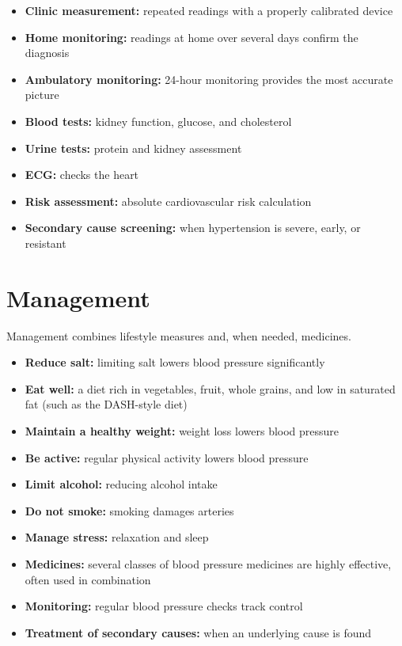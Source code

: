 \begin{itemize}
    \item \textbf{Clinic measurement:} repeated readings with a properly calibrated device
    \item \textbf{Home monitoring:} readings at home over several days confirm the diagnosis
    \item \textbf{Ambulatory monitoring:} 24-hour monitoring provides the most accurate picture
    \item \textbf{Blood tests:} kidney function, glucose, and cholesterol
    \item \textbf{Urine tests:} protein and kidney assessment
    \item \textbf{ECG:} checks the heart
    \item \textbf{Risk assessment:} absolute cardiovascular risk calculation
    \item \textbf{Secondary cause screening:} when hypertension is severe, early, or resistant
\end{itemize}

\section*{Management}
Management combines lifestyle measures and, when needed, medicines.

\begin{itemize}
    \item \textbf{Reduce salt:} limiting salt lowers blood pressure significantly
    \item \textbf{Eat well:} a diet rich in vegetables, fruit, whole grains, and low in saturated fat (such as the DASH-style diet)
    \item \textbf{Maintain a healthy weight:} weight loss lowers blood pressure
    \item \textbf{Be active:} regular physical activity lowers blood pressure
    \item \textbf{Limit alcohol:} reducing alcohol intake
    \item \textbf{Do not smoke:} smoking damages arteries
    \item \textbf{Manage stress:} relaxation and sleep
    \item \textbf{Medicines:} several classes of blood pressure medicines are highly effective, often used in combination
    \item \textbf{Monitoring:} regular blood pressure checks track control
    \item \textbf{Treatment of secondary causes:} when an underlying cause is found
\end{itemize}

